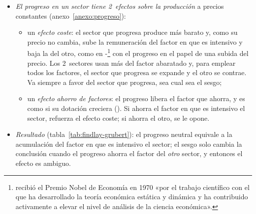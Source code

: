\documentclass[11pt]{article}
\begin{document}
\begin{itemize}
\item \emph{El progreso en un sector tiene 2~efectos sobre la producción} a precios constantes (anexo~\ref{anexo:progreso}):
  \begin{itemize}
  \item un \emph{efecto coste}: el sector que progresa produce más barato y, como su precio no cambia, sube la remuneración del factor en que es intensivo y baja la del otro, como en -\footnote{ recibió el Premio Nobel de Economía en 1970 «por el trabajo científico con el que ha desarrollado la teoría económica estática y dinámica y ha contribuido activamente a elevar el nivel de análisis de la ciencia económica»\nocite{Nobel1970Samuelson}.} con el progreso en el papel de una subida del precio. Los 2~sectores usan más del factor abaratado y, para emplear todos los factores, el sector que progresa se expande y el otro se contrae. Va siempre a favor del sector que progresa, sea cual sea el sesgo;
  \item un \emph{efecto ahorro de factores}: el progreso libera el factor que ahorra, y es como si su dotación creciera (). Si ahorra el factor en que es intensivo el sector, refuerza el efecto coste; si ahorra el otro, se le opone.
  \end{itemize}
\item \emph{Resultado} (tabla~\ref{tab:findlay-grubert}): el progreso neutral equivale a la acumulación del factor en que es intensivo el sector; el sesgo solo cambia la conclusión cuando el progreso ahorra el factor del \emph{otro} sector, y entonces el efecto es ambiguo.
\end{itemize}
\end{document}
